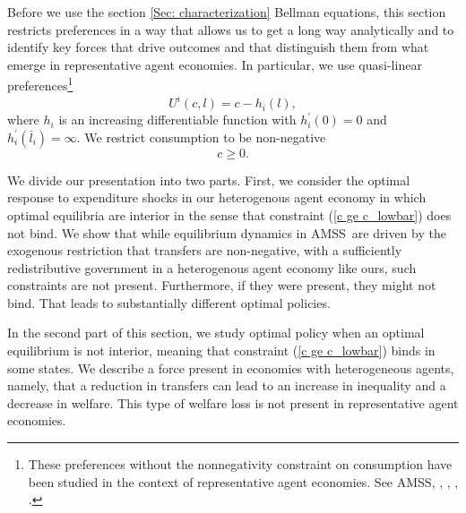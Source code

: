 \documentclass[thmsb,11pt]{article}
\begin{document}
\smallskip
Before we use the section \ref{Sec: characterization}  Bellman equations, this section restricts preferences in a way that allows us to get a long way analytically and to identify
key forces that drive outcomes and that  distinguish them from what emerge in  representative agent economies.
In particular, we use  quasi-linear preferences\footnote{These preferences without the nonnegativity constraint on consumption have been studied in
the context of representative
agent economies.
See  AMSS, \cite{Farhi2010}, \cite{Battaglini2007,Battaglini2008}, \cite{Yared2010}, \cite{Faraglia2011}.}
\begin{equation}
U^{i}\left( c,l\right) =c-h_{i}(l),  \label{quasilinear}
\end{equation}%
where $h_{i}$ is an increasing differentiable function with $h_{i}^{\prime
}\left( 0\right) =0$ and $h_{i}^{\prime }\left( \bar{l}_{i}\right) =\infty $.
We restrict consumption  to be non-negative
\begin{equation}
c\geq 0.  \label{c ge c_lowbar}
\end{equation}%

We divide our presentation   into two parts. First, we
consider the optimal response to expenditure shocks in our heterogenous agent
economy in which optimal equilibria are interior in the sense that  constraint (\ref{c ge c_lowbar}) does not bind. %
We show that while  equilibrium dynamics in AMSS\ are
driven by the exogenous restriction that transfers are non-negative,  with a sufficiently redistributive government in
a heterogenous agent economy  like ours, such
constraints are not present. Furthermore, if they were present, they might not bind.  That leads to substantially different  optimal policies.

In the second part of this section, we  study  optimal policy when an optimal
equilibrium is not interior, meaning that constraint (\ref{c ge c_lowbar}) binds in
some states. We describe a force
 present in  economies  with heterogeneous %
 agents, namely, that a
reduction in transfers can lead to an increase in inequality and a
decrease in welfare. This type of welfare loss is not present in
representative agent economies.
\end{document}
